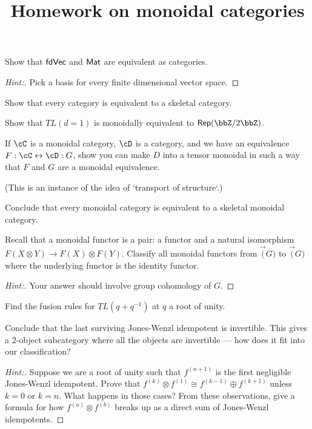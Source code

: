 \documentclass[11pt]{article}
\begin{document}
\title{Homework on monoidal categories}
\maketitle

\begin{exercise}
Show that $\mathsf{fdVec}$ and $\mathsf{Mat}$ are equivalent as categories.
\end{exercise}
\begin{proof}[Hint:]
Pick a basis for every finite dimensional vector space.
\end{proof}

\begin{exercise}
Show that every category is equivalent to a skeletal category.
\end{exercise}

\begin{exercise}
Show that $TL(d=1)$ is monoidally equivalent to $\Rep(\bbZ / 2 \bbZ)$.
\end{exercise}

\begin{exercise}
If $\cC$ is a monoidal category, $\cD$ is a category, and we have an equivalence $F:\cC \leftrightarrow \cD:G$, show you can make $D$ into a tensor monoidal in such a way that $F$ and $G$ are a monoidal equivalence.
\end{exercise}
(This is an instance of the idea of `transport of structure`.)

\begin{exercise}
Conclude that every monoidal category is equivalent to a skeletal monoidal category. 
\end{exercise}

\begin{exercise}
Recall that a monoidal functor is a pair: a functor and a natural isomorphism $F(X \otimes Y) \to F(X) \otimes F(Y)$.  Classify all monoidal functors from $\Vec(G)$ to $\Vec(G)$ where the underlying functor is the identity functor. 
\end{exercise}
\begin{proof}[Hint:]
Your answer should involve group cohomology of $G$.
\end{proof}

\begin{exercise}
Find the fusion rules for $TL(q+q^{-1})$ at $q$ a root of unity.

Conclude that the last surviving Jones-Wenzl idempotent is invertible.  This gives a 2-object subcategory where all the objects are invertible --- how does it fit into our classification?
\end{exercise}
\begin{proof}[Hint:]
Suppose we are a root of unity such that $f^{(n+1)}$ is the first negligible Jones-Wenzl idempotent. Prove that $f^{(k)} \otimes f^{(1)} \cong f^{(k-1)} \oplus f^{(k+1)}$ unless $k=0$ or $k=n$. What happens in those cases? From these observations, give a formula for how $f^{(a)} \otimes f^{(b)}$ breaks up as a direct sum of Jones-Wenzl idempotents.
\end{proof}
\end{document}
